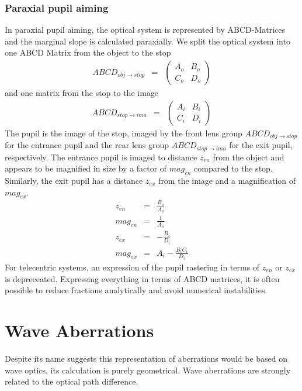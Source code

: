 \documentclass[12pt,a4paper,twoside,openright,BCOR10mm,headsepline,titlepage,abstracton,chapterprefix,final]{scrreprt}
\begin{document}
\subsubsection{Paraxial pupil aiming}
In paraxial pupil aiming, the optical system is represented by ABCD-Matrices and the marginal slope is calculated paraxially.
We split the optical system into one ABCD Matrix from the object to the stop
\begin{eqnarray*}
 ABCD_{obj\rightarrow stop} &=&
 \begin{pmatrix}
  A_o & B_o \\ C_o & D_o
 \end{pmatrix}
\end{eqnarray*}
and one matrix from the stop to the image
\begin{eqnarray*}
 ABCD_{stop\rightarrow ima} &=&
 \begin{pmatrix}
  A_i & B_i \\ C_i & D_i
 \end{pmatrix}
\end{eqnarray*}
The pupil is the image of the stop, imaged by the front lens group $ABCD_{obj\rightarrow stop}$ for the entrance pupil and the rear lens group $ABCD_{stop\rightarrow ima}$ for the exit pupil, respectively.
The entrance pupil is imaged to distance $z_{en}$ from the object and appears to be magnified in size by a factor of $mag_{en}$ compared to the stop. 
Similarly, the exit pupil has a distance $z_{ex}$ from the image and a magnification of $mag_{ex}$.
\begin{eqnarray}
 z_{en} &=& \frac{B_o}{A_o} \\
 mag_{en} &=& \frac{1}{A_o} \\
 z_{ex} &=& - \frac{B_i}{D_i} \\
 mag_{ex} &=& A_i - \frac{B_i C_i}{D_i}
\end{eqnarray}
For telecentric systems, an expression of the pupil rastering in terms of $z_{en}$ or $z_{ex}$ is depreceated. 
Expressing everything in terms of ABCD matrices, it is often possible to reduce fractions analytically and avoid numerical instabilities.

\section{Wave Aberrations}
Despite its name suggests this representation of aberrations would be based on wave optics, its calculation is purely geometrical.
Wave aberrations are strongly related to the optical path difference.
\end{document}
